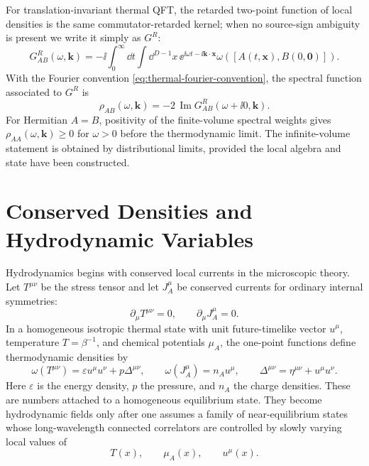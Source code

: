 For translation-invariant thermal QFT, the retarded two-point function of
local densities is the same commutator-retarded kernel; when no source-sign
ambiguity is present we write it simply as \(G^R\):
\begin{equation}
  G^R_{AB}(\omega,\mathbf k)
  =
  -\ii\int_0^\infty \dd t\int \dd^{D-1}x\,
  \ee^{\ii\omega t-\ii\mathbf k\cdot\mathbf x}
  \omega([A(t,\mathbf x),B(0,\mathbf0)]) .
  \label{eq:thermal-retarded-qft-definition}
\end{equation}
With the Fourier convention \eqref{eq:thermal-fourier-convention}, the
spectral function associated to \(G^R\) is
\begin{equation}
  \rho_{AB}(\omega,\mathbf k)
  =
  -2\,\operatorname{Im}G^R_{AB}(\omega+\ii0,\mathbf k).
  \label{eq:thermal-rho-retarded-sign}
\end{equation}
For Hermitian \(A=B\), positivity of the finite-volume spectral weights gives
\(\rho_{AA}(\omega,\mathbf k)\geq0\) for \(\omega>0\) before the thermodynamic
limit.  The infinite-volume statement is obtained by distributional limits,
provided the local algebra and state have been constructed.

\section{Conserved Densities and Hydrodynamic Variables}

Hydrodynamics begins with conserved local currents in the microscopic theory.
Let \(T^{\mu\nu}\) be the stress tensor and let \(J_A^\mu\) be conserved
currents for ordinary internal symmetries:
\begin{equation}
  \partial_\mu T^{\mu\nu}=0,
  \qquad
  \partial_\mu J_A^\mu=0 .
  \label{eq:thermal-conservation-laws}
\end{equation}
In a homogeneous isotropic thermal state with unit future-timelike vector
\(u^\mu\), temperature \(T=\beta^{-1}\), and chemical potentials \(\mu_A\),
the one-point functions define thermodynamic densities by
\begin{equation}
  \omega(T^{\mu\nu})
  =
  \varepsilon u^\mu u^\nu+p\Delta^{\mu\nu},
  \qquad
  \omega(J_A^\mu)=n_A u^\mu,
  \qquad
  \Delta^{\mu\nu}=\eta^{\mu\nu}+u^\mu u^\nu .
  \label{eq:thermal-homogeneous-one-point-functions}
\end{equation}
Here \(\varepsilon\) is the energy density, \(p\) the pressure, and \(n_A\) the
charge densities.  These are numbers attached to a homogeneous equilibrium
state.  They become hydrodynamic fields only after one assumes a family of
near-equilibrium states whose long-wavelength connected correlators are
controlled by slowly varying local values of
\[
  T(x),\qquad \mu_A(x),\qquad u^\mu(x).
\]

